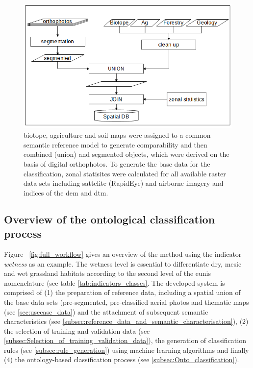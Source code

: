 \documentclass[authoryear,review,12pt,number]{elsarticle}
\begin{document}
\begin{figure} \includegraphics[width=1\textwidth]{diagrams/pre_processing.png}
    \caption{biotope, agriculture and soil maps were assigned to a
    common semantic reference model to generate comparability and then 
combined (union)
    and segmented objects, which were derived on the basis of digital
    orthophotos. To generate the base data for the classification, zonal
    statisitcs were calculated for all available raster data sets including
    sattelite (RapidEye) and airborne imagery and indices of the \gls{dem} and
    \gls{dtm}.
    \label{fig:pre-processing}}
\end{figure}


\subsection{Overview of the ontological classification process}
\label{subsec:method_overview}
Figure ~\ref{fig:full_workflow} gives an overview of the method using the
indicator \textit{wetness} as an example. The wetness level is essential to
differentiate dry, mesic and wet grassland habitats according to the second
level of the \gls{eunis} nomenclature (see table \ref{tab:indicators_classes}.
The developed system is comprised of (1) the preparation of reference
data, including a spatial union of the base data sets (pre-segmented,
pre-classified aerial photos and thematic maps (see
\ref{sec:usecase_data}) and the attachment of
subsequent semantic characteristics (see 
\ref{subsec:reference_data_and_semantic_characterisation}), (2)
the selection of training and validation data (see
\ref{subsec:Selection_of_training_validation_data}), the generation of
classification rules (see 
\ref{subsec:rule_generation}) using machine learning algorithms and
finally (4) the ontology-based classification process (see \ref{subsec:Onto_classification}). 
\end{document}
